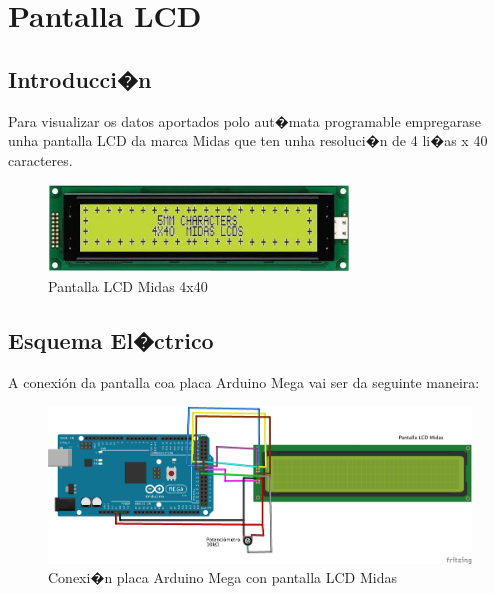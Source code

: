 \documentclass[11pt,twoside]{book}
\begin{document}
\chapter{Pantalla LCD}

\section{Introducci�n}

Para visualizar os datos aportados polo aut�mata programable empregarase unha pantalla LCD da marca Midas que ten unha resoluci�n de 4 li�as x 40 caracteres. 

\begin{figure}[H]
	\begin{center}
		\includegraphics[width=8cm]{images/lcd.jpg}
	\end{center}
	\caption{Pantalla LCD Midas 4x40}
	\label{fig:PantallaLCD}
\end{figure}

\section{Esquema El�ctrico}

A conexión da pantalla coa placa Arduino Mega vai ser da seguinte maneira:

\begin{figure}[H]
	\begin{center}
		\includegraphics[width=15cm]{images/conexionArduinoLCD.png}
	\end{center}
	\caption{Conexi�n placa Arduino Mega con pantalla LCD Midas}
	\label{fig:ConexionESP8266}
\end{figure}
\end{document}
